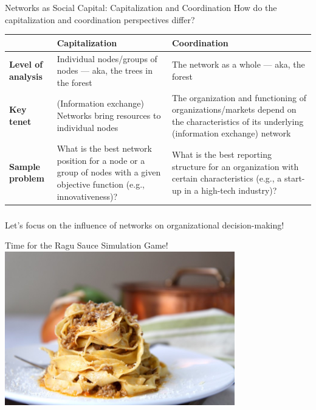 \documentclass[show notes, aspectratio=1610]{beamer}
\begin{document}
\begin{frame}{Networks as Social Capital: Capitalization and Coordination}
	{How do the capitalization and coordination perspectives differ?}
	\small
	\begin{table}
	\begin{center}
		\begin{tabular}[c]{p{2.75cm}|p{4.5cm}|p{4.5cm}}
			\textbf{} &
			\textbf{Capitalization} & 
			\textbf{Coordination} \\
			\hline
			\textbf{Level of analysis} &
			Individual nodes/groups of nodes --- aka, the trees 
			in the forest &
			The network as a whole --- aka, the forest \\ \hline
			\textbf{Key tenet} &
			(Information exchange) Networks bring resources to 
			individual nodes & 
			The organization and functioning of organizations/markets 
			depend on the characteristics of its underlying 
			(information exchange) network \\ \hline
			\textbf{Sample problem} &
			What is the best network position for a node or a group 
			of nodes with a given objective function (e.g.,
			innovativeness)? & What is the best reporting structure
			for an organization with certain characteristics (e.g.,
			a start-up in a high-tech industry)?\\
			\hline
		\end{tabular}
	\end{center}
	\end{table}
\end{frame}

\begin{frame}
  \frametitle{}
  \centering
  \Large
  Let's focus on the influence of networks on organizational decision-making!
\end{frame}

\begin{frame}{Time for the Ragu Sauce Simulation Game!}{}
	\centering
	\includegraphics[width=0.75\textwidth]{../images/pasta_ragu.jpeg}
\end{frame}
\end{document}

